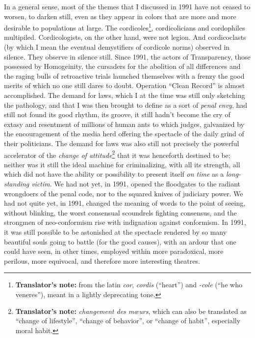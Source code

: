 In a general sense, most of the themes that I discussed in 1991 have not ceased to worsen, to darken still, even as they appear in colors that are more and more desirable to populations at large. The cordicoles\footnote{\textbf{Translator's note:} from the latin \textit{cor}, \textit{cordis} (``heart'') and \textit{-cole} (``he who veneres''), meant in a lightly deprecating tone.}, cordicolicians and cordophiles multipiled. Cordicologists, on the other hand, were not legion. And cordicoclasts (by which I mean the eventual demystifiers of cordicole norms) observed in silence. They observe in silence still. Since 1991, the actors of Transparency, those possessed by Homogeinity, the cursaders for the abolition of all differences and the raging bulls of retroactive trials launched themselves with a frenzy the good merits of which no one still dares to doubt. Operation ``Clean Record'' is almost accomplished. The demand for laws, which I at the time was still only sketching the pathology, and that I was then brought to define as a sort of \textit{penal envy}, had still not found its good rhythm, its groove, it still hadn't become the cry of extasy and resentment of millions of human ants to which judges, galvanized by the encouragement of the media herd offering the spectacle of the daily grind of their politicians. The demand for laws was also still not precisely the powerful accelerator of the \textit{change of attitude}\footnote{\textbf{Translator's note:} \textit{changement des mœurs}, which can also be translated as ``change of lifestyle'', ``change of behavior'', or ``change of habit'', especially moral habit.} that it was henceforth destined to be; neither was it still the ideal machine for criminalizing, with all its strength, all which did not have the ability or possibility to present itself \textit{on time} as a \textit{long-standing victim}. We had not yet, in 1991, opened the floodgates to the radiant wrongdoers of the penal code, nor to the squared knives of judiciary power. We had not quite yet, in 1991, changed the meaning of words to the point of seeing, without blinking, the worst consensual scoundrels fighting consensus, and the strongmen of neo-conformism rise with indignation against conformism. In 1991, it was still possible to be astonished at the spectacle rendered by so many beautiful souls going to battle (for the good causes), with an ardour that one could have seen, in other times, employed within more paradoxical, more perilous, more equivocal, and therefore more interesting theatres.

